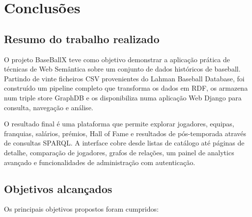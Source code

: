 \chapter{Conclus\~oes}

\section{Resumo do trabalho realizado}

O projeto BaseBallX teve como objetivo demonstrar a aplica\c{c}\~ao pr\'atica de t\'ecnicas de Web Sem\^antica sobre um conjunto de dados hist\'oricos de baseball. Partindo de vinte ficheiros CSV provenientes do Lahman Baseball Database, foi constru\'ido um pipeline completo que transforma os dados em RDF, os armazena num triple store GraphDB e os disponibiliza numa aplica\c{c}\~ao Web Django para consulta, navega\c{c}\~ao e análise.

O resultado final \'{e} uma plataforma que permite explorar jogadores, equipas, franquias, sal\'arios, pr\'emios, Hall of Fame e resultados de p\'os-temporada atrav\'es de consultas SPARQL. A interface cobre desde listas de cat\'alogo at\'e p\'aginas de detalhe, compara\c{c}\~ao de jogadores, grafos de rela\c{c}\~oes, um painel de analytics avan\c{c}ado e funcionalidades de administra\c{c}\~ao com autentica\c{c}\~ao.

\section{Objetivos alcan\c{c}ados}

Os principais objetivos propostos foram cumpridos:

